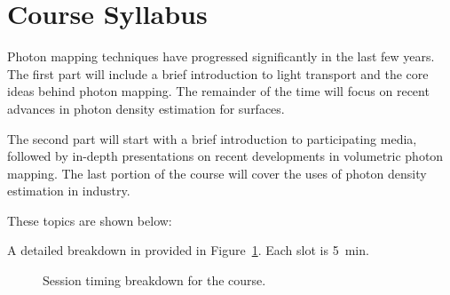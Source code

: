 \documentclass[11pt,fleqn]{book} %
\begin{document}

{}
\chapter*{Course Syllabus}

Photon mapping techniques have progressed significantly in the last few years. The first part will include a brief introduction to light transport and the core ideas behind photon mapping. The remainder of the time will focus on recent advances in photon density estimation for surfaces.

The second part will start with a brief introduction to participating media, followed by in-depth presentations on recent developments in volumetric photon mapping. The last portion of the course will cover the uses of photon density estimation in industry.

These topics are shown below:

A detailed breakdown in provided in Figure~\ref{fig:half-day}. Each slot is 5~min.

\begin{figure}[b!]
\begin{center}
\end{center}
\caption{%
\label{fig:half-day}%
Session timing breakdown for the course.
}
\end{figure}






{}
\tableofcontents %

\cleardoublepage %


\end{document}
